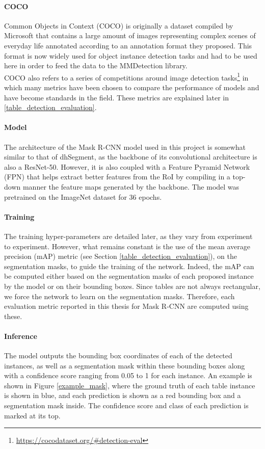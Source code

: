 \paragraph{COCO}
Common Objects in Context (COCO) is originally a dataset compiled by Microsoft that contains a large amount of images representing complex scenes of everyday life annotated according to an annotation format they proposed. This format is now widely used for object instance detection tasks and had to be used here in order to feed the data to the MMDetection library. \\
COCO also refers to a series of competitions around image detection tasks\footnote{\url{https://cocodataset.org/\#detection-eval}} in which many metrics have been chosen to compare the performance of models and have become standards in the field. These metrics are explained later in \ref{table_detection_evaluation}.

\paragraph{Model}
The architecture of the Mask R-CNN model used in this project is somewhat similar to that of dhSegment, as the backbone of its convolutional architecture is also a ResNet-50. However, it is also coupled with a Feature Pyramid Network (FPN) \citep{lin_feature_2017} that helps extract better features from the RoI by compiling in a top-down manner the feature maps generated by the backbone. The model was pretrained on the ImageNet dataset for 36 epochs. 

\paragraph{Training}
The training hyper-parameters are detailed later, as they vary from experiment to experiment. However, what remains constant is the use of the mean average precision (mAP) metric (see Section \ref{table_detection_evaluation}), on the segmentation masks, to guide the training of the network. Indeed, the mAP can be computed either based on the segmentation masks of each proposed instance by the model or on their bounding boxes. Since tables are not always rectangular, we force the network to learn on the segmentation masks. Therefore, each evaluation metric reported in this thesis for Mask R-CNN are computed using these. 

\paragraph{Inference}
The model outputs the bounding box coordinates of each of the detected instances, as well as a segmentation mask within these bounding boxes along with a confidence score ranging from 0.05 to 1 for each instance. An example is shown in Figure \ref{example_mask}, where the ground truth of each table instance is shown in blue, and each prediction is shown as a red bounding box and a segmentation mask inside. The confidence score and class of each prediction is marked at its top.

